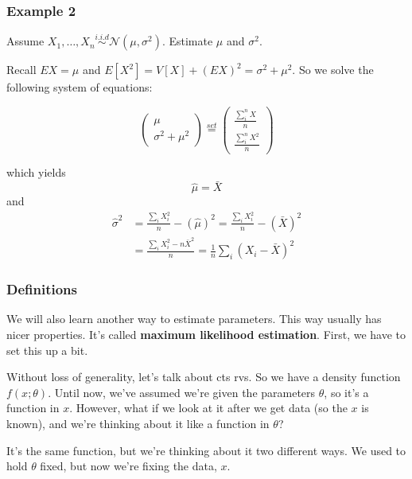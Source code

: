 \documentclass{beamer}
\begin{document}
\begin{frame}
\frametitle{Example 2}

Assume $X_1, \ldots, X_n \overset{i.i.d}{\sim} \mathcal{N}(\mu, \sigma^2)$. Estimate $\mu$ and $\sigma^2$. 
\newline
\pause

Recall $EX = \mu$ and $E[X^2] = V[X] + (EX)^2 = \sigma^2 + \mu^2$. So we solve the following system of equations:

\[ 
\left( \begin{array}{c}
\mu  \\
\sigma^2 + \mu^2  \end{array} \right)
\overset{set}{=}
\left( \begin{array}{c}
\frac{\sum_i^n X}{n}  \\
\frac{\sum_i^n X^2}{n}  \end{array} \right)
\] 

which yields 
\[
\hat{\mu} = \bar{X}
\]and 
\begin{align*}
\hat{\sigma}^2 &= \frac{\sum_i X_i^2}{n} - (\hat{\mu})^2 = \frac{\sum_i X_i^2}{n} - (\bar{X})^2 \\
&= \frac{\sum_i X_i^2 - n \bar{X}^2}{n} = \frac{1}{n}\sum_i(X_i - \bar{X})^2
\end{align*}

\end{frame}


\begin{frame}
\frametitle{Definitions}

We will also learn another way to estimate parameters. This way usually has nicer properties. It's called \textbf{maximum likelihood estimation}. First, we have to set this up a bit.
\newline

Without loss of generality, let's talk about cts rvs. So we have a density function $f(x; \theta)$. Until now, we've assumed we're given the parameters $\theta$, so it's a function in $x$. However, what if we look at it after we get data (so the $x$ is known), and we're thinking about it like a function in $\theta$? 
\newline

It's the same function, but we're thinking about it two different ways. We used to hold $\theta$ fixed, but now we're fixing the data, $x$. 
\end{frame}
\end{document}
